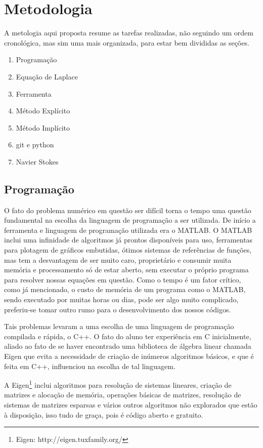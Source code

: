 \documentclass[journal]{IEEEtran}
\begin{document}
\section{Metodologia}
A metologia aqui proposta resume as tarefas realizadas, não seguindo um ordem cronológica, mas sim uma mais organizada, para estar bem divididas as seções.
\begin{enumerate}
  \item Programação
  \item Equação de Laplace
  \item Ferramenta
  \item Método Explícito
  \item Método Implícito
  \item git e python
  \item Navier Stokes
\end{enumerate}
\subsection{Programação}
O fato do problema numérico em questão ser difícil torna o tempo uma questão fundamental na escolha da linguagem de programação a ser utilizada. De início a ferramenta e linguagem de programação utilizada era o MATLAB\textregistered. O MATLAB inclui uma infinidade de algoritmos já prontos disponíveis para uso, ferramentas para plotagem de gráficos embutidas, ótimos sistemas de referências de funções, mas tem a desvantagem de ser muito caro, proprietário e consumir muita memória e processamento só de estar aberto, sem executar o próprio programa para resolver nossas equações em questão. Como o tempo é um fator crítico, como já mencionado, o custo de memória de um programa como o MATLAB, sendo executado por muitas horas ou dias, pode ser algo muito complicado, preferiu-se tomar outro rumo para o desenvolvimento dos nossos códigos.

Tais problemas levaram a uma escolha de uma linguagem de programação compilada e rápida, o C++. O fato do aluno ter experiência em C inicialmente, aliado ao fato de se haver encontrado uma biblioteca de álgebra linear chamada Eigen que evita a necessidade de criação de inúmeros algoritmos básicos, e que é feita em C++, influenciou na escolha de tal linguagem.

A Eigen\footnote{Eigen: http://eigen.tuxfamily.org/} inclui algoritmos para resolução de sistemas lineares, criação de matrizes e alocação de memória, operações básicas de matrizes, resolução de sistemas de matrizes esparsas e vários outros algoritmos não explorados que estão à disposição, isso tudo de graça, pois é código aberto e gratuito. 
\end{document}

